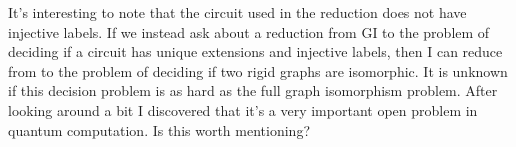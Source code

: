 \documentclass[../paper.tex]{subfiles}
\begin{document}





\begin{remark}
  It's interesting to note that the circuit used in the reduction does not have
  injective labels. If we instead ask about a reduction from GI to the problem
  of deciding if a circuit has unique extensions and injective labels, then I
  can reduce from to the problem of deciding if two rigid graphs are isomorphic.
  It is unknown if this decision problem is as hard as the full graph
  isomorphism problem. After looking around a bit I discovered that it's a very
  important open problem in quantum computation. Is this worth mentioning?
\end{remark}


\end{document}
